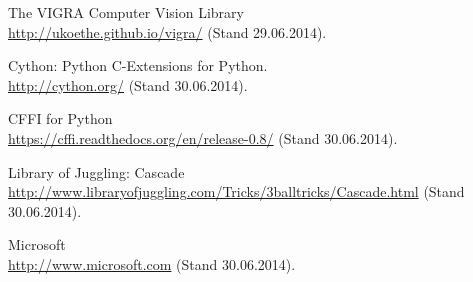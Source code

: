 \documentclass[12pt,a4paper,ngerman]{scrartcl}
\begin{document}
\begin{thebibliography}{99}
The VIGRA Computer Vision Library\\
\url{http://ukoethe.github.io/vigra/} (Stand 29.06.2014).

Cython: Python C-Extensions for Python.\\
\url{http://cython.org/} (Stand 30.06.2014).

CFFI for Python\\
\url{https://cffi.readthedocs.org/en/release-0.8/} (Stand 30.06.2014).

Library of Juggling: Cascade\\
\url{http://www.libraryofjuggling.com/Tricks/3balltricks/Cascade.html} (Stand 30.06.2014).

Microsoft\\
\url{http://www.microsoft.com} (Stand 30.06.2014).

\end{thebibliography}
\end{document}
